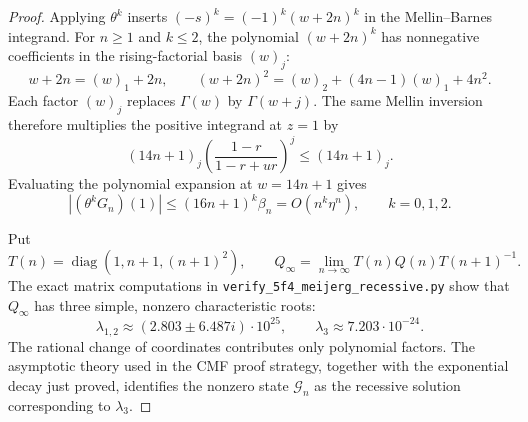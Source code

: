 \documentclass[oneside,english,11pt]{amsart}
\begin{document}
\begin{proof}
Applying $\theta^k$ inserts $(-s)^k=(-1)^k(w+2n)^k$ in
the Mellin--Barnes integrand. For $n\geq1$ and $k\leq2$,
the polynomial $(w+2n)^k$ has nonnegative coefficients in the
rising-factorial basis $(w)_j$:
\[
w+2n=(w)_1+2n,\qquad
(w+2n)^2=(w)_2+(4n-1)(w)_1+4n^2.
\]
Each factor $(w)_j$ replaces $\Gamma(w)$ by $\Gamma(w+j)$.
The same Mellin inversion therefore multiplies the positive
integrand at $z=1$ by
\[
(14n+1)_j\left(\frac{1-r}{1-r+ur}\right)^j
\leq(14n+1)_j.
\]
Evaluating the polynomial expansion at $w=14n+1$ gives
\[
|(\theta^kG_n)(1)|
\leq(16n+1)^k\beta_n
=O(n^k\eta^n),\qquad k=0,1,2.
\]

Put
\[
T(n)=\operatorname{diag}(1,n+1,(n+1)^2),\qquad
Q_\infty=\lim_{n\to\infty}T(n)Q(n)T(n+1)^{-1}.
\]
The exact matrix computations in
\texttt{verify\_5f4\_meijerg\_recessive.py}
show that $Q_\infty$ has three simple, nonzero characteristic roots:
\[
\lambda_{1,2}\approx(2.803\pm6.487i)\cdot10^{25},
\qquad \lambda_3\approx7.203\cdot10^{-24}.
\]
The rational change of coordinates contributes only polynomial
factors. The asymptotic theory used in the CMF proof strategy,
together with the exponential decay just proved, identifies the
nonzero state $\mathcal G_n$ as the recessive solution corresponding
to $\lambda_3$.
\end{proof}
\end{document}
